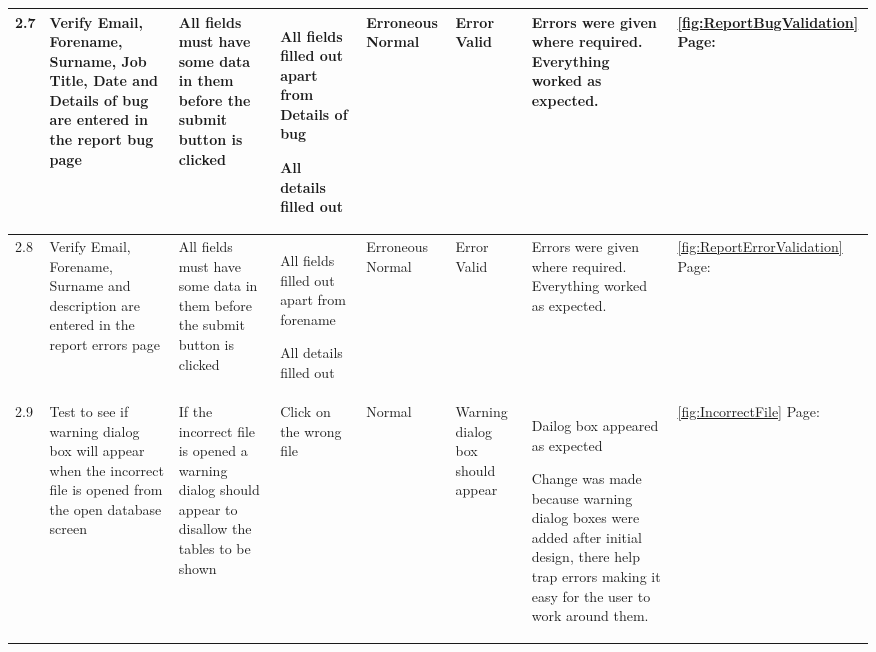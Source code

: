 \begin{landscape}
\begin{center}
\begin{longtable}{|p{1.5cm}|p{2cm}|p{2.5cm}|p{2cm}|p{2cm}|p{2cm}|p{3cm}|p{1.7cm}|}
2.7 & Verify Email, Forename, Surname, Job Title, Date and Details of bug are entered in the report bug page & All fields must have some data in them before the submit  button is clicked & All fields filled out apart from Details of bug \par \bigskip All details filled out & Erroneous \newline \newline \newline \newline \newline \newline   Normal & Error  \bigskip   \newline \newline \newline \newline \newline Valid &Errors were given where required.  \newline \newline \newline \newline \newline  Everything worked as expected.&\ref {fig:ReportBugValidation} Page: \pageref{fig:ReportBugValidation}\\ \hline
2.8 & Verify Email, Forename, Surname and description are entered in the report errors page & All fields must have some data in them before the submit  button is clicked & All fields filled out apart from forename \par \bigskip All details filled out & Erroneous  \newline \newline \newline \newline  \newline  Normal & Error \newline \newline \newline \newline  \newline Valid &Errors were given where required. \newline \newline \newline    Everything worked as expected.&\ref {fig:ReportErrorValidation} Page: \pageref{fig:ReportErrorValidation}  \\ \hline
\rowcolor{lightgray}2.9 & Test to see if warning dialog box will appear when the incorrect file is opened from the open database screen & If the incorrect file is opened a warning dialog should appear to disallow the tables to be shown & Click on the wrong file & Normal &Warning dialog box should appear &Dailog box appeared as expected  \par Change was made because warning dialog boxes were added after initial design, there help trap errors making it easy for the user to work around them. & \ref {fig:IncorrectFile} Page: \pageref{fig:IncorrectFile} \\ \hline

\end{longtable}
\end{center}
\end{landscape}
